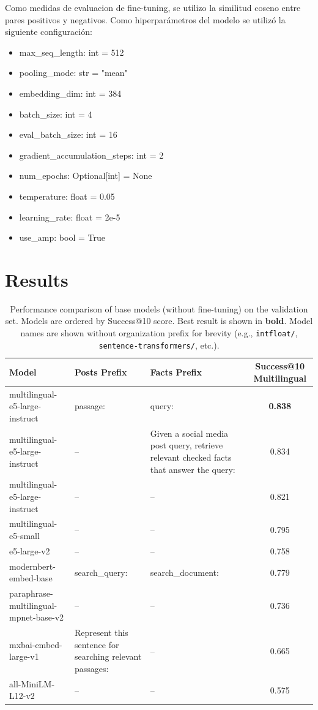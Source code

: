 \documentclass[11pt]{article}
\begin{document}
Como medidas de evaluacion de fine-tuning, se utilizo la similitud coseno entre pares positivos y negativos. 
Como hiperparámetros del modelo se utilizó la siguiente configuración:
\begin{itemize}
    \item max\_seq\_length: int = 512
    \item pooling\_mode: str = "mean"
    \item embedding\_dim: int = 384
    \item batch\_size: int = 4
    \item eval\_batch\_size: int = 16
    \item gradient\_accumulation\_steps: int = 2
    \item num\_epochs: Optional[int] = None
    \item temperature: float = 0.05
    \item learning\_rate: float = 2e-5
    \item use\_amp: bool = True
\end{itemize}
\section{Results}

\begin{table}[t]
  \centering
  \small
  \begin{tabular}{p{5cm}p{3cm}p{3cm}c}
    \hline
    \textbf{Model} & \textbf{Posts Prefix} & \textbf{Facts Prefix} & \textbf{Success@10 Multilingual} \\
    \hline
    multilingual-e5-large-instruct & passage: & query: & \textbf{0.838} \\
    multilingual-e5-large-instruct & -- & Given a social media post query, retrieve relevant checked facts that answer the query: & 0.834 \\
    multilingual-e5-large-instruct & -- & -- & 0.821 \\
    multilingual-e5-small & -- & -- & 0.795 \\
    e5-large-v2 & -- & -- & 0.758 \\
    modernbert-embed-base & search\_query: & search\_document: & 0.779 \\
    paraphrase-multilingual-mpnet-base-v2 & -- & -- & 0.736 \\
    mxbai-embed-large-v1 & Represent this sentence for searching relevant passages: & -- & 0.665 \\
    all-MiniLM-L12-v2 & -- & -- & 0.575 \\
    \hline
  \end{tabular}
  \caption{Performance comparison of base models (without fine-tuning) on the validation set. Models are ordered by Success@10 score. Best result is shown in \textbf{bold}. Model names are shown without organization prefix for brevity (e.g., \texttt{intfloat/}, \texttt{sentence-transformers/}, etc.).}
  \label{tab:base-models}
\end{table}
\end{document}

